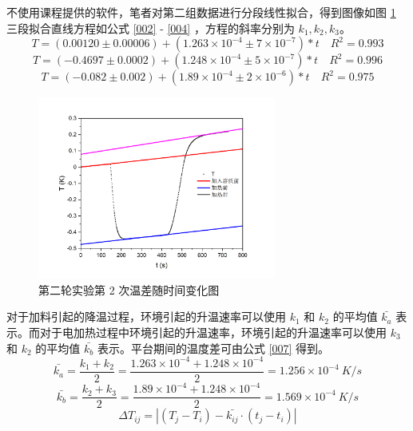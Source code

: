 \documentclass[cn,hazy,pku,12pt,normal,math=newtx,cite=super]{elegantnote}
\begin{document}
不使用课程提供的软件，笔者对第二组数据进行分段线性拟合，得到图像如图 \ref{6}
三段拟合直线方程如公式 \ref{002}  - \ref{004} ，方程的斜率分别为 $k_1, k_2, k_3$。
\begin{equation}\label{002}
    T = (0.00120 \pm 0.00006) + (1.263 \times 10^{-4} \pm 7 \times 10^{-7}) * t \quad R^2=0.993
\end{equation}
\begin{equation}\label{003}
    T = (-0.4697 \pm 0.0002) + (1.248 \times 10^{-4} \pm 5 \times 10^{-7}) * t \quad R^2=0.996
\end{equation}
\begin{equation}\label{004}
    T = (-0.082 \pm 0.002) + (1.89 \times 10^{-4} \pm 2 \times 10^{-6}) * t \quad R^2=0.975
\end{equation}
\begin{figure}[htbp]
    \centering
    \includegraphics[width = 0.70\textwidth]{image/Graph8.png}
    \caption{第二轮实验第 2 次温差随时间变化图}\label{6}
\end{figure}
对于加料引起的降温过程，环境引起的升温速率可以使用 $k_1$ 和 $k_2$ 的平均值 $\bar{k_{a}}$ 
表示。而对于电加热过程中环境引起的升温速率，环境引起的升温速率可以使用 $k_3$ 和 $k_2$ 的平均值 $\bar{k_{b}}$
表示。平台期间的温度差可由公式 \ref{007} 得到。
\begin{equation}\label{005}
    \bar{k_{a}} = \frac{k_1 + k_2}{2} = \frac{1.263 \times 10^{-4} + 1.248 \times 10^{-4}}{2} = 1.256 \times 10^{-4}\ K/s
\end{equation}
\begin{equation}\label{006}
    \bar{k_{b}} = \frac{k_2 + k_3}{2} = \frac{1.89 \times 10^{-4} + 1.248 \times 10^{-4}}{2} = 1.569 \times 10^{-4}\ K/s
\end{equation}
\begin{equation}\label{007}
    \Delta T_{ij} = |(T_j-T_i) - \bar{k_{ij}} \cdot (t_j - t_i)|
\end{equation}
\end{document}
